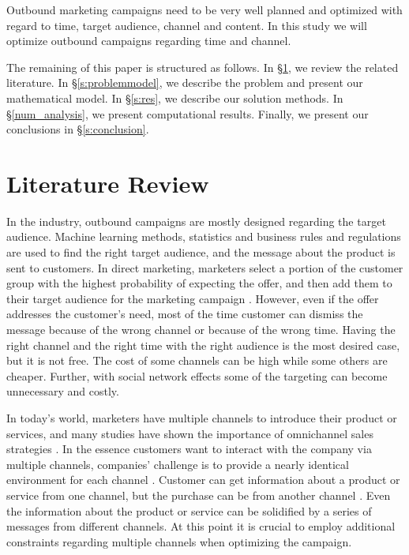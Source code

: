 \documentclass[11pt]{article}
\begin{document}
Outbound marketing campaigns need to be very well planned and optimized with regard to time, target audience, channel and content. In this study we will optimize outbound campaigns regarding time and channel.

The remaining of this paper is structured as follows. In \S \ref{s:litreview}, we review the related literature. In \S \ref{s:problemmodel}, we describe the problem and present our mathematical model. In \S \ref{s:res}, we describe our solution methods. In \S \ref{num_analysis}, we present computational results. Finally, we present our conclusions in \S \ref{s:conclusion}.




\section{Literature Review}  \label{s:litreview}

In the industry, outbound campaigns are mostly designed regarding the target audience. Machine learning methods, statistics and business rules and regulations are used to find the right target audience, and the message about the product is sent to customers. In direct marketing, marketers select a portion of the customer group with the highest probability of expecting the offer, and then add them to their target audience for the marketing campaign \citep{owczarczuk}. However, even if the offer addresses the customer’s need, most of the time customer can dismiss the message because of the wrong channel or because of the wrong time. Having the right channel and the right time with the right audience is the most desired case, but it is not free. The cost of some channels can be high while some others are cheaper. Further, with social network effects some of the targeting can become unnecessary and costly. %

In today’s world, marketers have multiple channels to introduce their product or services, and many studies have shown the importance of omnichannel sales strategies \citep{shankar, park}. In the essence customers want to interact with the company via multiple channels, companies’ challenge is to provide a nearly identical environment for each channel \citep{bell}. Customer can get information about a product or service from one channel, but the purchase can be from another channel \citep{park}. Even the information about the product or service can be solidified by a series of messages from different channels. At this point it is crucial to employ additional constraints regarding multiple channels when optimizing the campaign.
\end{document}
